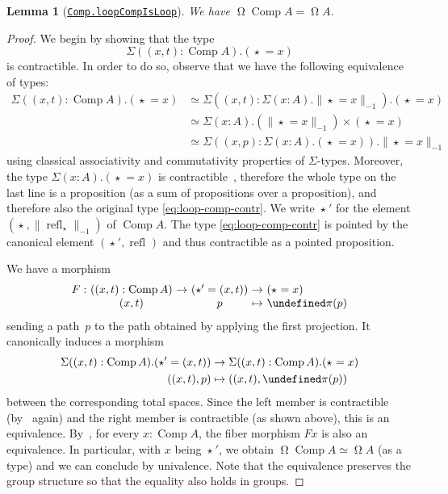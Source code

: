 \documentclass[10pt,a4paper]{amsart}
\newtheorem{lemma}[theorem]{Lemma}
\theoremstyle{definition}
\newcommand{\pt}[1]{\star_{#1}} %
\newcommand{\trunc}[2]{\|#2\|_{#1}} %
\newcommand{\ptrunc}[1]{\trunc{-1}{#1}} %
\newcommand{\refl}[1]{\operatorname{refl}_{#1}} %
\newcommand{\equivto}{\simeq} %
\newcommand{\Comp}{\operatorname{Comp}} %
\newcommand{\Loop}{\operatorname{\Omega}} %
\let\cong\undefined
\newcommand{\cong}[1]{#1^=} %
\newcommand{\fst}{\pi}
\newcommand{\agda}[2]{\href{https://smimram.github.io/generated-deloopings-agda/#1.html\##2}{\texttt{#1.#2}}}
\begin{document}
\begin{lemma}[\agda{Comp}{loopCompIsLoop}]
  \label{loop-comp}
  We have $\Loop\Comp A=\Loop A$.
\end{lemma}
\begin{proof}
  We begin by showing that the type
  \begin{equation}
    \label{eq:loop-comp-contr}
    \Sigma((x,t):\Comp A).(\pt{}=x)
  \end{equation}
  is contractible. In order to do so, observe that we have the following
  equivalence of types:
  \begin{align*}
    \Sigma((x,t):\Comp A).(\pt{}=x)
    &\simeq
    \Sigma((x,t):\Sigma(x:A).\ptrunc{\pt{}=x}).(\pt{}=x)
    \\
    &\equivto
    \Sigma(x:A).(\ptrunc{\pt{}=x})\times(\pt{}=x)
    \\
    &\equivto
    \Sigma((x,p):\Sigma(x:A).(\pt{}=x)).\ptrunc{\pt{}=x}
  \end{align*}
  using classical associativity and commutativity properties of
  $\Sigma$-types. Moreover, the type $\Sigma(x:A).(\pt{}=x)$ is
  contractible~\cite[Lemma~3.11.8]{hottbook}, therefore the whole type on the
  last line is a proposition (as a sum of propositions over a proposition), and
  therefore also the original type \cref{eq:loop-comp-contr}. We write $\pt{}'$
  for the element $(\pt{},\ptrunc{\refl{\pt{}}})$ of $\Comp A$. The type
  \cref{eq:loop-comp-contr} is pointed by the canonical element
  $(\pt{}',\refl{})$ and thus contractible as a pointed proposition.

  We have a morphism
  \[
    \begin{array}{r@{\ }c@{\ }c@{\ }c@{\ }c@{\ }l}
      F:&((x,t):\Comp A)&\to&(\pt{}'=(x,t))&\to&(\pt{}=x)\\
      &(x,t)&&p&\mapsto&\cong\fst(p)
    \end{array}
  \]
  sending a path~$p$ to the path obtained by applying the first projection. It
  canonically induces a morphism
  \begin{align*}
    \Sigma((x,t):\Comp A).(\pt{}'=(x,t))&\to\Sigma((x,t):\Comp A).(\pt{}=x)\\
    ((x,t),p)&\mapsto((x,t),\cong\fst(p))
  \end{align*}
  between the corresponding total spaces. Since the left member is contractible
  (by~\cite[Lemma~3.11.8]{hottbook} again) and the right member is contractible
  (as shown above), this is an equivalence. By~\cite[Theorem~4.7.7]{hottbook},
  for every $x:\Comp A$, the fiber morphism $F x$ is also an equivalence. In
  particular, with $x$ being $\pt{}'$, we obtain $\Loop\Comp A\simeq\Loop A$ (as
  a type) and we can conclude by univalence. Note that the equivalence preserves
  the group structure so that the equality also holds in groups.
\end{proof}
\end{document}
